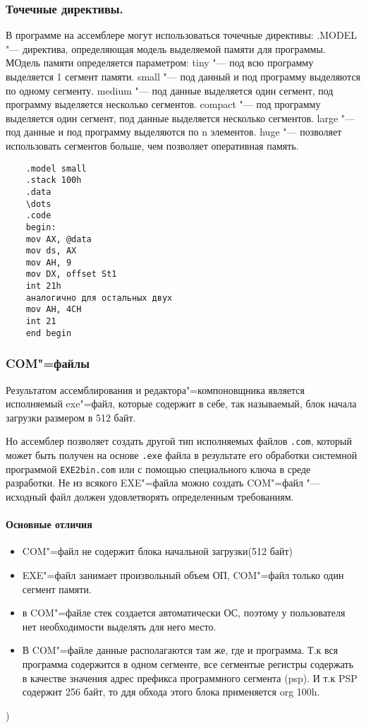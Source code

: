 \subsubsection{Точечные директивы.}

В программе на ассемблере могут использоваться точечные директивы:
.MODEL "--- директива, определяющая модель выделяемой памяти для программы.
МОдель памяти определяется параметром:
tiny "--- под всю программу выделяется 1 сегмент памяти.
small "--- под данный и под программу выделяются по одному сегменту.
medium "--- под данные выделяется один сегмент, под программу выделяется несколько сегментов.
compact "--- под программу выделяется один сегмент, под данные выделяется несколько сегментов.
large "--- под данные и под программу выделяются по n элементов.
huge "--- позволяет использовать сегментов больше, чем позволяет оперативная память.

\begin{verbatim}
    .model small
    .stack 100h
    .data 
    \dots
    .code
    begin:
    mov AX, @data
    mov ds, AX
    mov AH, 9
    mov DX, offset St1
    int 21h
    аналогично для остальных двух
    mov AH, 4CH
    int 21
    end begin    
\end{verbatim}

\subsubsection{COM"=файлы}

Результатом ассемблирования и редактора"=компоновщника является исполняемый exe"=файл, которые содержит в себе,
так называемый, блок начала загрузки размером в 512 байт.

Но ассемблер позволяет создать другой тип исполняемых
файлов \verb|.com|, который может быть получен на основе \verb|.exe| файла в результате его обработки системной программой
\verb|EXE2bin.com| или с помощью специального ключа в среде разработки. 
Не из всякого EXE"=файла можно создать
COM"=файл "--- исходный файл должен удовлетворять определенным требованиям.

\paragraph{Основные отличия}
\begin{itemize}
    \item COM"=файл не содержит блока начальной загрузки(512 байт)
    \item EXE"=файл занимает произвольный объем ОП, COM"=файл только один сегмент памяти.
    \item в COM"=файле стек создается автоматически ОС, поэтому у пользователя нет необходимости выделять для него место.
    \item В COM"=файле данные располагаются там же, где и программа. Т.к вся программа содержится в одном сегменте, все сегментые регистры содержать
    в качестве значения адрес префикса программного сегмента (psp). И т.к PSP содержит 256 байт, то ддя обхода этого блока применяется org 100h.
\end{itemize})

